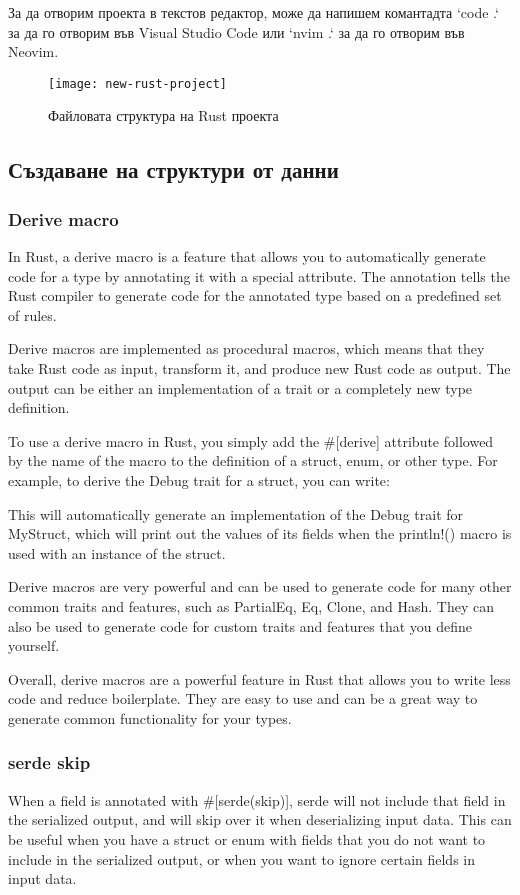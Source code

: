 За да отворим проекта в текстов редактор, може да напишем комантадта `code .` за
да го отворим във Visual Studio Code или `nvim .` за да го отворим във Neovim.
 
\begin{figure}[!htb]
  \texttt{[image: new-rust-project]}
  \centering
  \caption{Файловата структура на Rust проекта}
  \label{fig:new-rust-project}
\end{figure}



\subsection{Създаване на структури от данни}
\subsubsection{Derive macro}
In Rust, a derive macro is a feature that allows you to automatically generate
code for a type by annotating it with a special attribute. The annotation tells
the Rust compiler to generate code for the annotated type based on a predefined
set of rules.

Derive macros are implemented as procedural macros, which means that they take
Rust code as input, transform it, and produce new Rust code as output. The
output can be either an implementation of a trait or a completely new type
definition.

To use a derive macro in Rust, you simply add the \#[derive] attribute followed
by the name of the macro to the definition of a struct, enum, or other type.
For example, to derive the Debug trait for a struct, you can write:

This will automatically generate an implementation of the Debug trait for
MyStruct, which will print out the values of its fields when the println!()
macro is used with an instance of the struct.

Derive macros are very powerful and can be used to generate code for many other
common traits and features, such as PartialEq, Eq, Clone, and Hash. They can
also be used to generate code for custom traits and features that you define
yourself.

Overall, derive macros are a powerful feature in Rust that allows you to write
less code and reduce boilerplate. They are easy to use and can be a great way
to generate common functionality for your types.

\subsubsection{serde skip}
When a field is annotated with \#[serde(skip)], serde will not include that
field in the serialized output, and will skip over it when deserializing input
data. This can be useful when you have a struct or enum with fields that you do
not want to include in the serialized output, or when you want to ignore
certain fields in input data.

